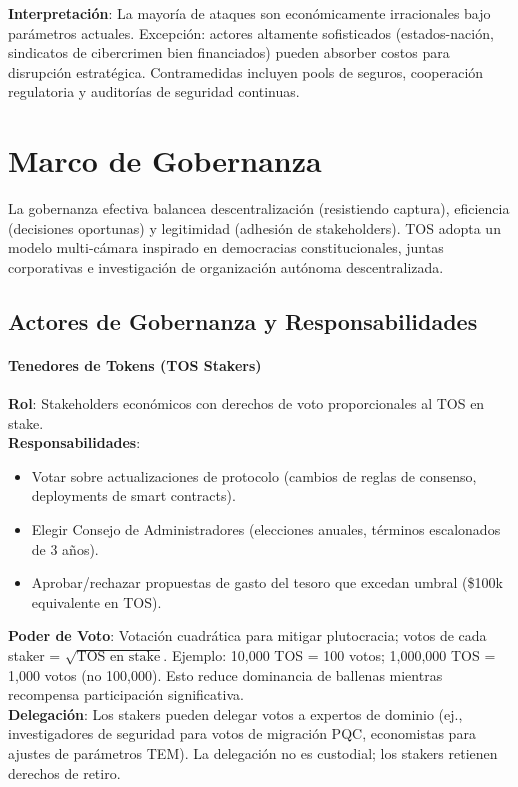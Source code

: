 \documentclass[11pt]{article}
\begin{document}
\textbf{Interpretación}: La mayoría de ataques son económicamente irracionales bajo parámetros actuales. Excepción: actores altamente sofisticados (estados-nación, sindicatos de cibercrimen bien financiados) pueden absorber costos para disrupción estratégica. Contramedidas incluyen pools de seguros, cooperación regulatoria y auditorías de seguridad continuas.

\section{Marco de Gobernanza}
\label{sec:governance}

La gobernanza efectiva balancea descentralización (resistiendo captura), eficiencia (decisiones oportunas) y legitimidad (adhesión de stakeholders). TOS adopta un modelo multi-cámara inspirado en democracias constitucionales, juntas corporativas e investigación de organización autónoma descentralizada.

\subsection{Actores de Gobernanza y Responsabilidades}

\paragraph{Tenedores de Tokens (TOS Stakers)}
\textbf{Rol}: Stakeholders económicos con derechos de voto proporcionales al TOS en stake.\\
\textbf{Responsabilidades}:
\begin{itemize}[noitemsep]
  \item Votar sobre actualizaciones de protocolo (cambios de reglas de consenso, deployments de smart contracts).
  \item Elegir Consejo de Administradores (elecciones anuales, términos escalonados de 3 años).
  \item Aprobar/rechazar propuestas de gasto del tesoro que excedan umbral (\$100k equivalente en TOS).
\end{itemize}
\textbf{Poder de Voto}: Votación cuadrática para mitigar plutocracia; votos de cada staker = $\sqrt{\text{TOS en stake}}$. Ejemplo: 10,000 TOS = 100 votos; 1,000,000 TOS = 1,000 votos (no 100,000). Esto reduce dominancia de ballenas mientras recompensa participación significativa.\\
\textbf{Delegación}: Los stakers pueden delegar votos a expertos de dominio (ej., investigadores de seguridad para votos de migración PQC, economistas para ajustes de parámetros TEM). La delegación no es custodial; los stakers retienen derechos de retiro.
\end{document}
